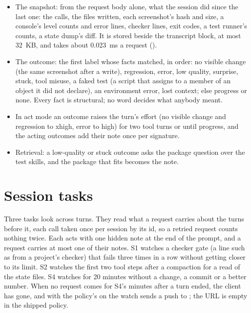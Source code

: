 \begin{itemize}
\item The snapshot: from the request body alone, what the session did since the last one: the calls, the files written, each screenshot's hash and size, a console's level counts and error lines, checker lines, exit codes, a test runner's counts, a state dump's diff. It is stored beside the transcript block, at most 32~KB, and takes about 0.023~ms a request (\measured).
\item The outcome: the first label whose facts matched, in order: no visible change (the same screenshot after a write), regression, error, low quality, surprise, stuck, tool misuse, a faked test (a script that assigns to a member of an object it did not declare), an environment error, lost context; else progress or none. Every fact is structural; no word decides what anybody meant.
\item In act mode an outcome raises the turn's effort (no visible change and regression to xhigh, error to high) for two tool turns or until progress, and the acting outcomes add their note once per signature.
\item Retrieval: a low-quality or stuck outcome asks the package question over the test skills, and the package that fits becomes the note.
\end{itemize}

\section{Session tasks}

Three tasks look across turns. They read what a request carries about the turns before it, each call taken once per session by its id, so a retried request counts nothing twice. Each acts with one hidden note at the end of the prompt, and a request carries at most one of their notes. S1 watches a checker gate (a line such as  from a project's checker) that fails three times in a row without getting closer to its limit. S2 watches the first two tool steps after a compaction for a read of the state files. S4 watches for 20 minutes without a change, a commit or a better number. When no request comes for S4's minutes after a turn ended, the client has gone, and with the policy's  on the watch sends a push to ; the URL is empty in the shipped policy.

